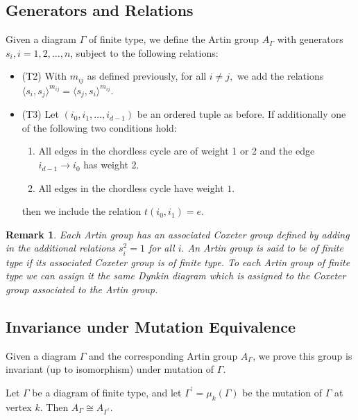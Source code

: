 \documentclass{beamer}
\newtheorem{rem}{Remark}
\begin{document}
\subsection{Generators and Relations}

\begin{frame}
Given a diagram $\Gamma$ of finite type, we define the Artin group $A_{\Gamma}$ with generators $s_i, i = 1,2,\ldots, n$, subject to the following relations:

\begin{block}

\begin{itemize}

\item{\alert{(T2)}} With $m_{ij}$ as defined previously, for all $i \neq j,$ we add the relations
$\langle s_i,s_j \rangle^{m_{ij}}= \langle s_j,s_i \rangle^{m_{ij}}.$

\item{\alert{(T3)}} Let $(i_0,i_1,\ldots,i_{d-1})$ be an ordered tuple as before. If additionally one of the following two conditions hold:
\begin{enumerate}
\item All edges in the chordless cycle are of weight 1 or 2 and the edge $i_{d-1}\rightarrow i_0$ has weight 2.
\item All edges in the chordless cycle have weight $1.$
\end{enumerate}
then we include the relation
$t(i_0,i_1) = e.$



\end{itemize}

\end{block}



\end{frame}

\begin{frame}
\begin{rem}
Each Artin group has an associated Coxeter group defined by adding in the additional relations $s_i^2 = 1$ for all $i.$ An Artin group is said to be of {\it finite type} if its associated Coxeter group is of finite type. To each Artin group of finite type we can assign it the same Dynkin diagram which is assigned to the Coxeter group associated to the Artin group.
\end{rem}
\end{frame}

\subsection{Invariance under Mutation Equivalence}

\begin{frame}
Given a diagram $\Gamma$ and the corresponding Artin group $A_{\Gamma}$, we prove this group is invariant (up to isomorphism) under mutation of $\Gamma$.

\begin{theorem}
Let $\Gamma$ be a diagram of finite type, and let $\Gamma^{\prime} = \mu_k(\Gamma)$ be the mutation of $\Gamma$ at vertex $k$. Then $A_{\Gamma} \cong A_{\Gamma^{\prime}}$.
\end{theorem}
\end{frame}
\end{document}
